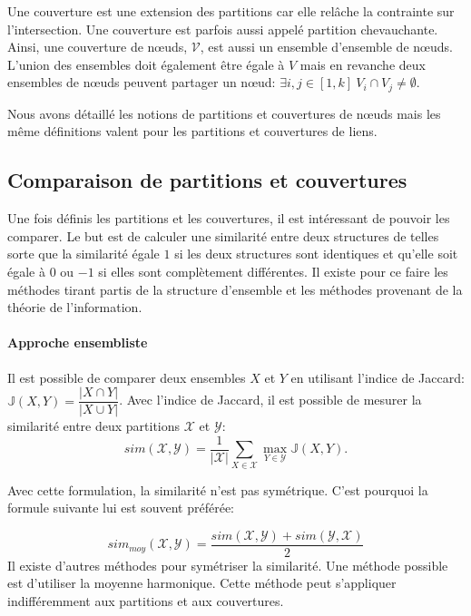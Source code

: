 Une couverture est une extension des partitions car elle relâche la contrainte sur l'intersection.
Une couverture est parfois aussi appelé partition chevauchante.
Ainsi, une couverture de n\oe uds, $\mathcal{V}$, est aussi un ensemble d'ensemble de n\oe uds.
L'union des ensembles doit également être égale à $V$ mais en revanche deux ensembles de n\oe uds peuvent partager un n\oe ud: $\exists i,j \in [1,k]\ V_i \cap V_j \neq \emptyset$.

Nous avons détaillé les notions de partitions et couvertures de n\oe uds mais les même définitions valent pour les partitions et couvertures de liens.

\subsection{Comparaison de partitions et couvertures}
Une fois définis les partitions et les couvertures, il est intéressant de pouvoir les comparer.
Le but est de calculer une similarité entre deux structures de telles sorte que la similarité égale $1$ si les deux structures sont identiques et qu'elle soit égale à $0$ ou $-1$ si elles sont complètement différentes.
Il existe pour ce faire les méthodes tirant partis de la structure d'ensemble et les méthodes provenant de la théorie de l'information.

\paragraph{Approche ensembliste}
\label{def:graphe_comparaison}
Il est possible de comparer deux ensembles $X$ et $Y$ en utilisant l'indice de Jaccard: $\mathbb{J}(X,Y) = \dfrac{|X \cap Y|}{|X \cup Y|}$.
Avec l'indice de Jaccard, il est possible de mesurer la similarité entre deux partitions $\mathcal{X}$ et $\mathcal{Y}$:
\begin{equation}
sim(\mathcal{X},\mathcal{Y})=\frac{1}{|\mathcal{X}|}\sum_{X \in \mathcal{X}}\max_{Y\in \mathcal{Y}}\mathbb{J}(X,Y).
\end{equation}

Avec cette formulation, la similarité n'est pas symétrique.
C'est pourquoi la formule suivante lui est souvent préférée:

\begin{equation}
sim_{moy}(\mathcal{X},\mathcal{Y}) = \dfrac{sim(\mathcal{X},\mathcal{Y})+sim(\mathcal{Y},\mathcal{X})}{2}
\end{equation}
Il existe d'autres méthodes pour symétriser la similarité.
Une méthode possible est d'utiliser la moyenne harmonique.
Cette méthode peut s'appliquer indifféremment aux partitions et aux couvertures.

